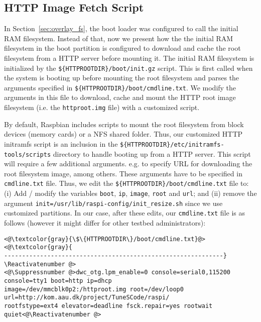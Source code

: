 \subsection{HTTP Image Fetch Script}
In Section~\ref{sec:overlay_fs}, the boot loader was configured to call
the initial \ac{RAM} filesystem. Instead of that, now we present how the
the initial \ac{RAM} filesystem in the boot partition is configured to
download and cache the root filesystem from a \ac{HTTP} server before
mounting it. The initial \ac{RAM} filesystem is initialized by the
\texttt{\$\{HTTPROOTDIR\}/boot/init.gz} script. This is first called
when the system is booting up before mounting the root filesystem and
parses the arguments specified in \texttt{\$\{HTTPROOTDIR\}/boot/cmdline.txt}.
We modify the arguments in this file to download, cache and mount the
\ac{HTTP} root image filesystem (i.e. the \texttt{httproot.img} file) with a
customized script.

By default, Raspbian includes scripts to mount the
root filesystem from block devices (memory cards) or a \ac{NFS} shared folder.
Thus, our customized \ac{HTTP} initramfs script is an inclusion in the
\texttt{\$\{HTTPROOTDIR\}/etc/initramfs-tools/scripts} directory to handle
booting up from a \ac{HTTP} server. This script will require a few
additional arguments. e.g. to specify \ac{URL} for downloading the root
filesystem image, among others. These arguments have to be specified in
\texttt{cmdline.txt} file. Thus, we edit the
\texttt{\$\{HTTPROOTDIR\}/boot/cmdline.txt} file to: (i) Add / modify
the variables \texttt{boot}, \texttt{ip}, \texttt{image},
\texttt{root} and \texttt{url}; and (ii) remove the argument
\texttt{init=/usr/lib/raspi-config/init\_resize.sh} since we use customized
partitions. In our case, after these edits, our \texttt{cmdline.txt} file
is as follows (however it might differ for other testbed administrators):

\Suppressnumber\begin{lstlisting}[]
<@\textcolor{gray}{\$\{HTTPROOTDIR\}/boot/cmdline.txt}@>
<@\textcolor{gray}{
-------------------------------------------------------------}
\Reactivatenumber @>
<@\Suppressnumber @>dwc_otg.lpm_enable=0 console=serial0,115200 console=tty1 boot=http ip=dhcp
image=/dev/mmcblk0p2:/httproot.img root=/dev/loop0 url=http://kom.aau.dk/project/TuneSCode/raspi/
rootfstype=ext4 elevator=deadline fsck.repair=yes rootwait quiet<@\Reactivatenumber @>
\end{lstlisting}
\FloatBarrier
\vspace{-5mm}


